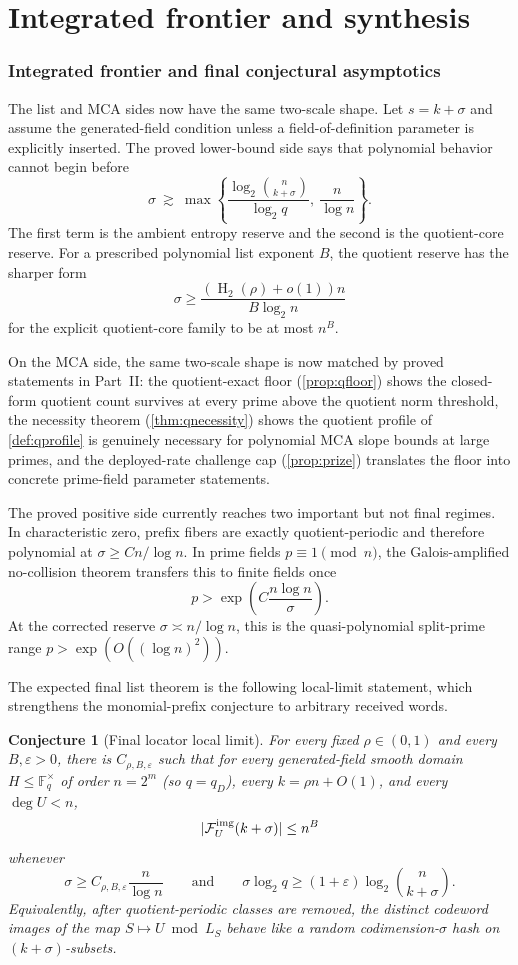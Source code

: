 \documentclass[11pt]{article}
\newtheorem{conjecture}[conjecture]{Conjecture}
\theoremstyle{definition}
\newcommand{\F}{\mathbb F}
\newcommand{\eps}{\varepsilon}
\newcommand{\HH}{\operatorname{H}_2}
\newcommand{\ImgFib}{\mathcal F^{\rm img}}
\begin{document}
\part{Integrated frontier and synthesis}

\section{Integrated frontier and final conjectural asymptotics}\label{sec:integrated-frontier}

The list and MCA sides now have the same two-scale shape.  Let $s=k+\sigma$ and assume the generated-field condition unless a field-of-definition parameter is explicitly inserted.  The proved lower-bound side says that polynomial behavior cannot begin before
\[
        \sigma\ \gtrsim\ \max\left\{
        \frac{\log_2\binom n{k+\sigma}}{\log_2 q},\ \frac{n}{\log n}
        \right\}.
\]
The first term is the ambient entropy reserve and the second is the quotient-core reserve.  For a prescribed polynomial list exponent $B$, the quotient reserve has the sharper form
\[
        \sigma\ge \frac{(\HH(\rho)+o(1))n}{B\log_2 n}
\]
for the explicit quotient-core family to be at most $n^B$.

On the MCA side, the same two-scale shape is now matched by proved statements in Part~II: the quotient-exact floor (\cref{prop:qfloor}) shows the closed-form quotient count survives at every prime above the quotient norm threshold, the necessity theorem (\cref{thm:qnecessity}) shows the quotient profile of \cref{def:qprofile} is genuinely necessary for polynomial MCA slope bounds at large primes, and the deployed-rate challenge cap (\cref{prop:prize}) translates the floor into concrete prime-field parameter statements.

The proved positive side currently reaches two important but not final regimes.  In characteristic zero, prefix fibers are exactly quotient-periodic and therefore polynomial at $\sigma\ge Cn/\log n$.  In prime fields $p\equiv1\pmod n$, the Galois-amplified no-collision theorem transfers this to finite fields once
\[
        p>\exp\!\left(C\frac{n\log n}{\sigma}\right).
\]
At the corrected reserve $\sigma\asymp n/\log n$, this is the quasi-polynomial split-prime range $p>\exp(O((\log n)^2))$.

The expected final list theorem is the following local-limit statement, which strengthens the monomial-prefix conjecture to arbitrary received words.
\begin{conjecture}[Final locator local limit]\label{conj:final-locator}
For every fixed $\rho\in(0,1)$ and every $B,\eps>0$, there is $C_{\rho,B,\eps}$ such that for every generated-field smooth domain $H\le\F_q^\times$ of order $n=2^m$ (so $q=q_D$), every $k=\rho n+O(1)$, and every $\deg U<n$,
\[
        |\ImgFib_U(k+\sigma)|\le n^B
\]
whenever
\[
        \sigma\ge C_{\rho,B,\eps}\frac n{\log n}
        \qquad\text{and}\qquad
        \sigma\log_2q\ge(1+\eps)\log_2\binom n{k+\sigma}.
\]
Equivalently, after quotient-periodic classes are removed, the distinct codeword
images of the map $S\mapsto U\bmod L_S$ behave like a random
codimension-$\sigma$ hash on $(k+\sigma)$-subsets.
\end{conjecture}
\end{document}
